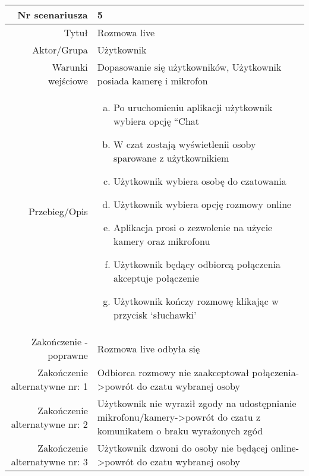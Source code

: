 \documentclass[12pt,a4paper]{article}
\begin{document}
\begin{tabular}{|r|l|} \hline
Nr scenariusza & 5 \\
\hline
Tytuł & Rozmowa live \\
\hline
Aktor/Grupa & Użytkownik \\
\hline
Warunki wejściowe & Dopasowanie się użytkowników, Użytkownik posiada kamerę i mikrofon
 \\
\hline
Przebieg/Opis & 
\begin{enumerate}[a)]
\item Po uruchomieniu aplikacji użytkownik wybiera opcję “Chat
\item W czat zostają wyświetlenii osoby sparowane z użytkownikiem
\item Użytkownik wybiera  osobę do czatowania
\item Użytkownik wybiera opcję rozmowy online
\item Aplikacja prosi o zezwolenie na użycie kamery oraz mikrofonu
\item Użytkownik będący odbiorcą połączenia akceptuje połączenie
\item Użytkownik kończy rozmowę klikając w przycisk ‘słuchawki’
\end{enumerate}
\\
\hline
Zakończenie - poprawne & Rozmowa live odbyła się
\\ 
\hline
Zakończenie alternatywne nr: 1 & Odbiorca rozmowy nie zaakceptował połączenia->powrót do czatu wybranej osoby
\\
\hline
Zakończenie alternatywne nr: 2 & Użytkownik nie wyraził zgody na udostępnianie mikrofonu/kamery->powrót do czatu z komunikatem o braku wyrażonych zgód
\\
\hline
Zakończenie alternatywne nr: 3 & Użytkownik dzwoni do osoby nie będącej online->powrót do czatu wybranej osoby
\\
\hline
\end{tabular}
\end{document}

